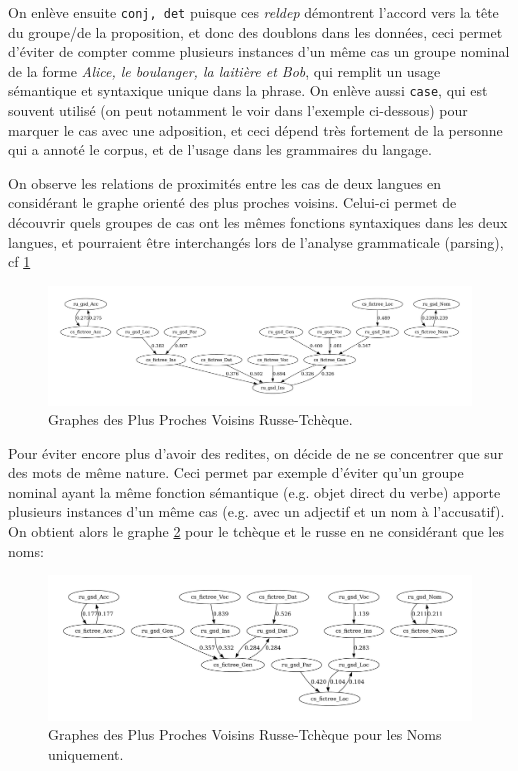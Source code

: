 \documentclass{cours}
\begin{document}
On enlève ensuite \texttt{conj, det} puisque ces \textit{reldep} démontrent l'accord vers la tête du groupe/de la proposition, et donc des doublons dans les données, ceci permet d'éviter de compter comme plusieurs instances d'un même cas un groupe nominal de la forme \emph{Alice, le boulanger, la laitière et Bob}, qui remplit un usage sémantique et syntaxique unique dans la phrase.
On enlève aussi \texttt{case}, qui est souvent utilisé (on peut notamment le voir dans l'exemple ci-dessous) pour marquer le cas avec une adposition, et ceci dépend très fortement de la personne qui a annoté le corpus, et de l'usage dans les grammaires du langage.\\
\medskip

On observe les relations de proximités entre les cas de deux langues en considérant le graphe orienté des plus proches voisins.
Celui-ci permet de découvrir quels groupes de cas ont les mêmes fonctions syntaxiques dans les deux langues, et pourraient être interchangés lors de l'analyse grammaticale (parsing), cf \ref{fig_gnn_ru_cz}

\begin{figure}
	\centering
	\includegraphics[width=\textwidth]{Figures/GNN/gnn_ru_gsd_cs_fictree}
	\caption{Graphes des Plus Proches Voisins Russe-Tchèque.}
	\label{fig_gnn_ru_cz}
\end{figure}

Pour éviter encore plus d'avoir des redites, on décide de ne se concentrer que sur des mots de même nature.
Ceci permet par exemple d'éviter qu'un groupe nominal ayant la même fonction sémantique (e.g. objet direct du verbe) apporte plusieurs instances d'un même cas (e.g. avec un adjectif et un nom à l'accusatif).
On obtient alors le graphe \ref{fig_gnn_nouns_ru_cz} pour le tchèque et le russe en ne considérant que les noms:

\begin{figure}
	\centering
	\includegraphics[width=\textwidth]{Figures/GNN/gnn_ru_gsd_cs_fictree_Nouns_Only}
	\caption{Graphes des Plus Proches Voisins Russe-Tchèque pour les Noms uniquement.}
	\label{fig_gnn_nouns_ru_cz}
\end{figure}
\end{document}
